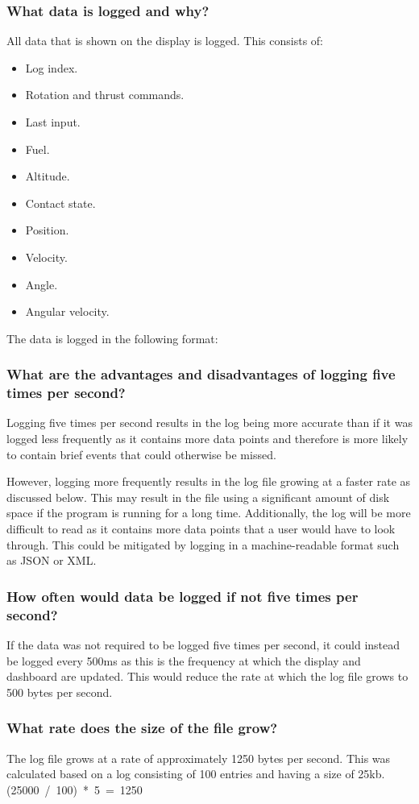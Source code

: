 \documentclass{article}
\begin{document}
{        \subsubsection{What data is logged and why?}
        All data that is shown on the display is logged. This consists of:
        \begin{itemize}
            \item Log index.
            \item Rotation and thrust commands.
            \item Last input.
            \item Fuel.
            \item Altitude.
            \item Contact state.
            \item Position.
            \item Velocity.
            \item Angle.
            \item Angular velocity.
        \end{itemize}

        The data is logged in the following format:
        

        \subsubsection{What are the advantages and disadvantages of logging five times per second?}
        Logging five times per second results in the log being more accurate than if it was logged less frequently
        as it contains more data points and therefore is more likely to contain brief events that could otherwise
        be missed.

        However, logging more frequently results in the log file growing at a faster rate as discussed below. This
        may result in the file using a significant amount of disk space if the program is running for a long time.
        Additionally, the log will be more difficult to read as it contains more data points that a user would
        have to look through. This could be mitigated by logging in a machine-readable format such as JSON or XML.

        \subsubsection{How often would data be logged if not five times per second?}
        If the data was not required to be logged five times per second, it could instead be logged every 500ms
        as this is the frequency at which the display and dashboard are updated. This would reduce the rate at which the log
        file grows to 500 bytes per second.

        \subsubsection{{What rate does the size of the file grow?}}
        The log file grows at a rate of approximately 1250 bytes per second.
        This was calculated based on a log consisting of 100 entries and having
        a size of 25kb. \mbox{(25000 / 100) * 5 = 1250}
}
\end{document}
